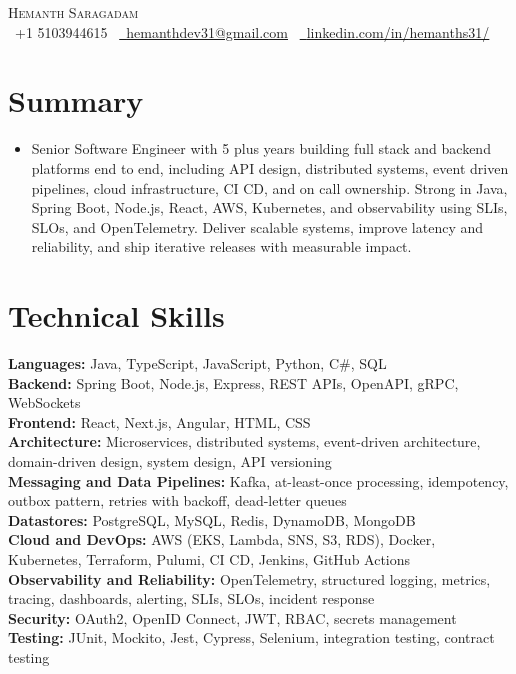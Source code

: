 \documentclass[letterpaper,10pt]{article}
\newcommand{\resumeItem}[1]{\item\small{#1 \vspace{-2pt}}}
\newcommand{\resumeSubHeadingListStart}{\begin{itemize}[leftmargin=0.0in, label={}]\setlength\itemsep{4pt}}
\newcommand{\resumeSubHeadingListEnd}{\end{itemize}}
\begin{document}
\begin{center}
    {\Huge \scshape Hemanth Saragadam} \\ \vspace{2pt}
    \small
    \raisebox{-0.1\height}\faPhone\ +1 5103944615 \  
    \href{mailto:hemanthdev31@gmail.com}{\raisebox{-0.2\height}\faEnvelope\ \underline{hemanthdev31@gmail.com}} \ 
     \href{https://www.linkedin.com/in/hemanths31/}{\raisebox{-0.2\height}\faLinkedin\ \underline{linkedin.com/in/hemanths31/}}
    \vspace{-10pt}
\end{center}


\section{Summary}
\resumeSubHeadingListStart
\resumeItem{Senior Software Engineer with 5 plus years building full stack and backend platforms end to end, including API design, distributed systems, event driven pipelines, cloud infrastructure, CI CD, and on call ownership. Strong in Java, Spring Boot, Node.js, React, AWS, Kubernetes, and observability using SLIs, SLOs, and OpenTelemetry. Deliver scalable systems, improve latency and reliability, and ship iterative releases with measurable impact.}
\resumeSubHeadingListEnd



\section{Technical Skills}
\begin{itemize}[leftmargin=0.15in, label={}]
\small{\item{
\textbf{Languages:} Java, TypeScript, JavaScript, Python, C\#, SQL \\
\textbf{Backend:} Spring Boot, Node.js, Express, REST APIs, OpenAPI, gRPC, WebSockets \\
\textbf{Frontend:} React, Next.js, Angular, HTML, CSS \\
\textbf{Architecture:} Microservices, distributed systems, event-driven architecture, domain-driven design, system design, API versioning \\
\textbf{Messaging and Data Pipelines:} Kafka, at-least-once processing, idempotency, outbox pattern, retries with backoff, dead-letter queues \\
\textbf{Datastores:} PostgreSQL, MySQL, Redis, DynamoDB, MongoDB \\
\textbf{Cloud and DevOps:} AWS (EKS, Lambda, SNS, S3, RDS), Docker, Kubernetes, Terraform, Pulumi, CI CD, Jenkins, GitHub Actions \\
\textbf{Observability and Reliability:} OpenTelemetry, structured logging, metrics, tracing, dashboards, alerting, SLIs, SLOs, incident response \\
\textbf{Security:} OAuth2, OpenID Connect, JWT, RBAC, secrets management \\
\textbf{Testing:} JUnit, Mockito, Jest, Cypress, Selenium, integration testing, contract testing
}}
\end{itemize}
\end{document}
